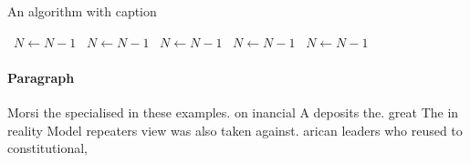 \documentclass[a4paper]{article}
\begin{document}
\begin{algorithm}
\caption{An algorithm with caption}
\begin{algorithmic}
\    \State $N \gets N - 1$
\    \State $N \gets N - 1$
\    \State $N \gets N - 1$
\    \State $N \gets N - 1$
\    \State $N \gets N - 1$
\EndWhile
\end{algorithmic}
\end{algorithm}

\paragraph{Paragraph}
Morsi the specialised in these examples. on inancial A deposits the. great The in reality Model repeaters view was also taken against. arican leaders who reused to constitutional,
\end{document}
